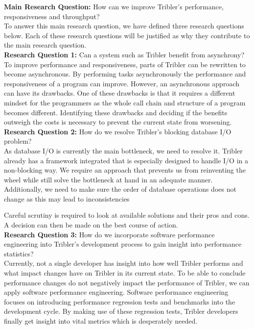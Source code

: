 \textbf{Main Research Question:} How can we improve Tribler's performance, responsiveness and throughput?\\

To answer this main research question, we have defined three research questions below. Each of these research questions will be justified as why they contribute to the main research question.\\

\textbf{Research Question 1:} Can a system such as Tribler benefit from asynchrony?\\

To improve performance and responsiveness, parts of Tribler can be rewritten to become asynchronous.
By performing tasks asynchronously the performance and responsiveness of a program can improve.
However, an asynchronous approach can have its drawbacks. 
One of these drawbacks is that it requires a different mindset for the programmers as the whole call chain and structure of a program becomes different.
Identifying these drawbacks and deciding if the benefits outweigh the costs is necessary to prevent the current state from worsening. \\

\noindent
\textbf{Research Question 2:} How do we resolve Tribler's blocking database I/O problem?\\

As database I/O is currently the main bottleneck, we need to resolve it.
Tribler already has a framework integrated that is especially designed to handle I/O in a non-blocking way.
We require an approach that prevents us from reinventing the wheel while still solve the bottleneck at hand in an adequate manner.
Additionally, we need to make sure the order of database operations does not change as this may lead to inconsistencies

Careful scrutiny is required to look at available solutions and their pros and cons.
A decision can then be made on the best course of action. \\

\noindent
\textbf{Research Question 3:} How do we incorporate software performance engineering into Tribler's development process to gain insight into performance statistics?\\

Currently, not a single developer has insight into how well Tribler performs and what impact changes have on Tribler in its current state.
To be able to conclude performance changes do not negatively impact the performance of Tribler, we can apply software performance engineering.
Software performance engineering focuses on introducing performance regression tests and benchmarks into the development cycle.
By making use of these regression tests, Tribler developers finally get insight into vital metrics which is desperately needed.\\


